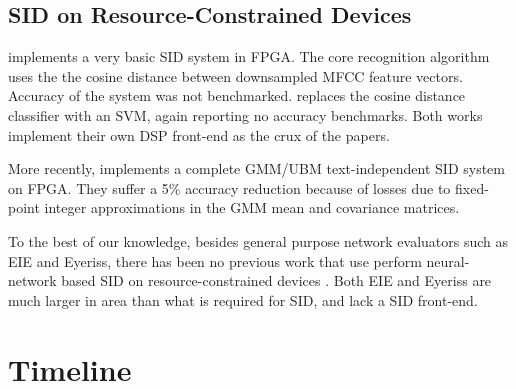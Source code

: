 \documentclass[journal,12pt,onecolumn,draftclsnofoot,]{sty/IEEEtran}
\begin{document}
\subsection{SID on Resource-Constrained Devices}
\cite{sidfpga} implements a very basic SID system in FPGA. The core recognition algorithm uses the the cosine distance between downsampled MFCC feature vectors. Accuracy of the system was not benchmarked. \cite{svmfpga} replaces the cosine distance classifier with an SVM, again reporting no accuracy benchmarks. Both works implement their own DSP front-end as the crux of the papers.

More recently, \cite{fpga_gmm} implements a complete GMM/UBM text-independent SID system on FPGA. They suffer a 5\% accuracy reduction because of losses due to fixed-point integer approximations in the GMM mean and covariance matrices.

To the best of our knowledge, besides general purpose network evaluators such as EIE and Eyeriss, there has been no previous work that use perform neural-network based SID on resource-constrained devices \cite{eie, eyeriss}. Both EIE and Eyeriss are much larger in area than what is required for SID, and lack a SID front-end.

\section{Timeline}
\label{timeline}
\end{document}
